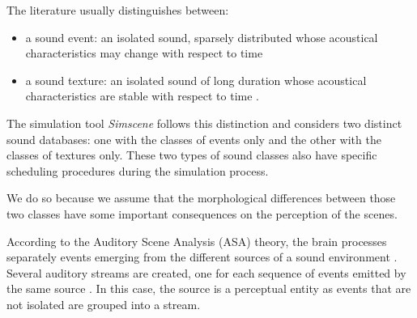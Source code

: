 \documentclass[12pt]{elsarticle}
\newcommand{\ie}{\emph{i.\,e.}}
\begin{document}
The literature usually distinguishes between:

\begin{itemize}
\item {a sound event}: an isolated sound, sparsely distributed whose acoustical characteristics may change with respect to time
\item {a sound texture}: an isolated sound of long duration whose acoustical characteristics are stable with respect to time \cite{saint1995classification}.
\end{itemize}


The simulation tool \emph{Simscene} follows this distinction and considers two distinct sound databases: one with the classes of events only and the other with the classes of textures only. These two types of sound classes also have specific scheduling procedures during the simulation process.


We do so because we assume that the morphological differences between those two classes have some important consequences on the perception of the scenes.


According to the Auditory Scene Analysis (ASA) theory, the brain processes separately events emerging from the different sources of a sound environment \cite{bregman1994auditory}. Several auditory streams are created, one for each sequence of events emitted by the same source \cite{carlyon2004brain}. In this case, the source is a perceptual entity as events that are not isolated are grouped into a stream.

\end{document}
